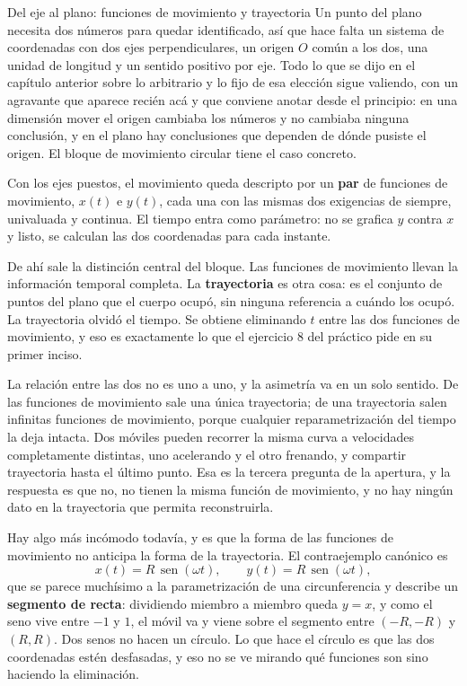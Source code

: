 \documentclass[11pt,openany]{book}
\newcommand{\sen}{\operatorname{sen}}
\begin{document}
\begin{bloque}{Del eje al plano: funciones de movimiento y trayectoria}
Un punto del plano necesita dos números para quedar identificado, así que hace falta un sistema de coordenadas con dos ejes perpendiculares, un origen $O$ común a los dos, una unidad de longitud y un sentido positivo por eje. Todo lo que se dijo en el capítulo anterior sobre lo arbitrario y lo fijo de esa elección sigue valiendo, con un agravante que aparece recién acá y que conviene anotar desde el principio: en una dimensión mover el origen cambiaba los números y no cambiaba ninguna conclusión, y en el plano hay conclusiones que dependen de dónde pusiste el origen. El bloque de movimiento circular tiene el caso concreto.

Con los ejes puestos, el movimiento queda descripto por un \textbf{par} de funciones de movimiento, $x(t)$ e $y(t)$, cada una con las mismas dos exigencias de siempre, univaluada y continua. El tiempo entra como parámetro: no se grafica $y$ contra $x$ y listo, se calculan las dos coordenadas para cada instante.

De ahí sale la distinción central del bloque. Las funciones de movimiento llevan la información temporal completa. La \textbf{trayectoria} es otra cosa: es el conjunto de puntos del plano que el cuerpo ocupó, sin ninguna referencia a cuándo los ocupó. La trayectoria olvidó el tiempo. Se obtiene eliminando $t$ entre las dos funciones de movimiento, y eso es exactamente lo que el ejercicio 8 del práctico pide en su primer inciso.

La relación entre las dos no es uno a uno, y la asimetría va en un solo sentido. De las funciones de movimiento sale una única trayectoria; de una trayectoria salen infinitas funciones de movimiento, porque cualquier reparametrización del tiempo la deja intacta. Dos móviles pueden recorrer la misma curva a velocidades completamente distintas, uno acelerando y el otro frenando, y compartir trayectoria hasta el último punto. Esa es la tercera pregunta de la apertura, y la respuesta es que no, no tienen la misma función de movimiento, y no hay ningún dato en la trayectoria que permita reconstruirla.

Hay algo más incómodo todavía, y es que la forma de las funciones de movimiento no anticipa la forma de la trayectoria. El contraejemplo canónico es
\[
x(t) = R\,\sen(\omega t), \qquad y(t) = R\,\sen(\omega t),
\]
que se parece muchísimo a la parametrización de una circunferencia y describe un \textbf{segmento de recta}: dividiendo miembro a miembro queda $y = x$, y como el seno vive entre $-1$ y $1$, el móvil va y viene sobre el segmento entre $(-R,-R)$ y $(R,R)$. Dos senos no hacen un círculo. Lo que hace el círculo es que las dos coordenadas estén desfasadas, y eso no se ve mirando qué funciones son sino haciendo la eliminación.


\end{bloque}
\end{document}
